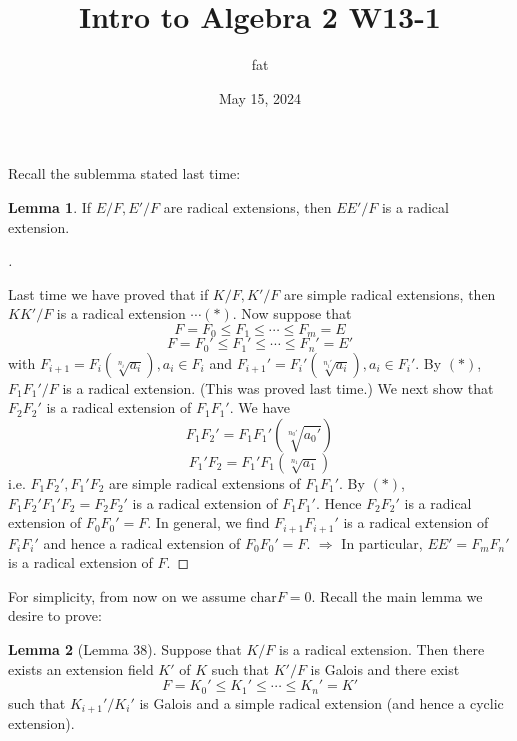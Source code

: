 \documentclass{article}
\title{Intro to Algebra 2 W13-1}
\author{fat}
\date{May 15, 2024}
\theoremstyle{definition}
\newtheorem{lem}{Lemma}
\newenvironment{proofs}[1][\proofname]{%
  \begin{proof}[#1]$ $\par\nobreak\ignorespaces
}{%
  \end{proof}
}
\newcommand{\Ra}{\Rightarrow}
\newcommand{\cha}{\text{char}}
\begin{document}
\maketitle
\thispagestyle{fancy}
\renewcommand{\footrulewidth}{0.4pt}
\cfoot{\thepage}
\renewcommand{\headrulewidth}{0.4pt}

Recall the sublemma stated last time:
\begin{lem}
	If $E/F, E'/F$ are radical extensions, then $E E'/F$ is a radical extension.
\end{lem}

\begin{proofs}
	Last time we have proved that if $K/F, K'/F$ are simple radical extensions, then $K K'/F$ is a radical extension $\cdots (*)$.
	Now suppose that 
	\[
		F = F_0 \leq F_1 \leq \cdots \leq F_m = E
	\]
	\[
		F = F_0' \leq F_1' \leq \cdots \leq F_n' = E'
	\]
	with $F_{i + 1} = F_i(\sqrt[n_i]{a_i}), a_i \in F_i$ and $F_{i + 1}' = F_i'(\sqrt[n_i']{a_i}), a_i \in F_i'$.
	By $(*)$, $F_1 F_1'/F$ is a radical extension. 
	(This was proved last time.)
	We next show that $F_2 F_2'$ is a radical extension of $F_1 F_1'$.
	We have
	\[
		F_1 F_2' = F_1 F_1'(\sqrt[n_0']{a_0'})
	\]
	\[
		F_1' F_2 = F_1' F_1(\sqrt[n_1]{a_1})
	\]
	i.e. $F_1 F_2', F_1' F_2$ are simple radical extensions of $F_1 F_1'$.
	By $(*)$, $F_1 F_2' F_1' F_2 = F_2 F_2'$ is a radical extension of $F_1 F_1'$.
	Hence $F_2 F_2'$ is a radical extension of $F_0 F_0' = F$.
	In general, we find $F_{i + 1} F_{i + 1}'$ is a radical extension of $F_i F_i'$ and hence a radical extension of $F_0 F_0' = F$.
	$\Ra$ In particular, $E E' = F_m F_n'$ is a radical extension of $F$.
\end{proofs}

For simplicity, from now on we assume $\cha F = 0$.
Recall the main lemma we desire to prove:

\begin{lem}[Lemma 38]
	Suppose that $K/F$ is a radical extension.
	Then there exists an extension field $K'$ of $K$ such that $K'/F$ is Galois and there exist
	\[
		F = K_0' \leq K_1' \leq \cdots \leq K_n' = K'
	\]
	such that $K_{i + 1}'/K_i'$ is Galois and a simple radical extension (and hence a cyclic extension).
\end{lem}
\end{document}
